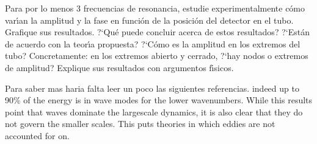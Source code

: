 \documentclass[laboratorio]{guia}
\begin{document}
Para por lo menos 3 frecuencias de resonancia, estudie experimentalmente c\'omo
var\'\i an la amplitud y la fase en funci\'on de la posici\'on del detector en
el tubo. Grafique sus resultados. ?`Qu\'e puede concluir acerca de estos
resultados? ?`Est\'an de acuerdo con la teor\'\i a propuesta? ?`C\'omo es la
amplitud en los extremos del tubo? Concretamente: en los extremos abierto y
cerrado, ?`hay nodos o extremos de amplitud? Explique sus resultados con
argumentos f\'\i sicos.




\begin{sabermas} Para saber mas haria falta leer un poco las siguientes
    referencias.  indeed up to 90\% of the energy is in wave modes for the
    lower wavenumbers. While this results point that waves dominate the
    largescale dynamics, it is also clear that they do not govern the smaller
    scales.  This puts theories in which eddies are not accounted for on.
\end{sabermas}

%  
\end{document}
